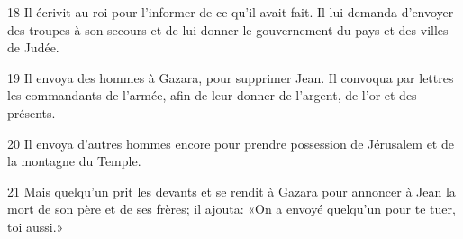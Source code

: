 
18 Il écrivit au roi pour l’informer de ce qu’il avait fait. Il lui demanda d’envoyer des troupes à son secours et de lui donner le gouvernement du pays et des villes de Judée.

19 Il envoya des hommes à Gazara, pour supprimer Jean. Il convoqua par lettres les commandants de l’armée, afin de leur donner de l’argent, de l’or et des présents.

20 Il envoya d’autres hommes encore pour prendre possession de Jérusalem et de la montagne du Temple.

21 Mais quelqu’un prit les devants et se rendit à Gazara pour annoncer à Jean la mort de son père et de ses frères; il ajouta: «On a envoyé quelqu’un pour te tuer, toi aussi.»
